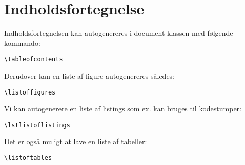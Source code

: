 \documentclass[class=report, crop=false]{standalone}
\begin{document}
    \section{Indholdsfortegnelse}
    Indholdsfortegnelsen kan autogenereres i document klassen med følgende kommando:
    \begin{tcolorbox}
        \verb|\tableofcontents|
    \end{tcolorbox}
    \noindent Derudover kan en liste af figure autogenereres således:
    \begin{tcolorbox}
        \verb|\listoffigures|
    \end{tcolorbox}
    \noindent Vi kan autogenerere en liste af listings som ex. kan bruges til kodestumper:
    \begin{tcolorbox}
        \verb|\lstlistoflistings|
    \end{tcolorbox}
    \noindent Det er også muligt at lave en liste af tabeller:
    \begin{tcolorbox}
        \verb|\listoftables|
    \end{tcolorbox}
\end{document}
